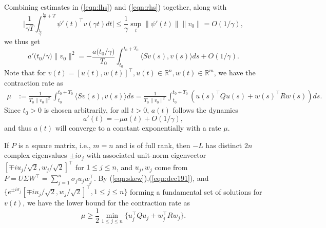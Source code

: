 \documentclass[11pt]{article}
\newcommand{\Rm}{{\mathbb R}}
\newcommand{\1}{\mathds{1}}
\begin{document}
Combining estimates in (\ref{eqn:lhs}) and (\ref{eqn:rhs}) together, along with
\begin{equation*}
    \Big|\frac{1}{\gamma T}\int_{\frac{t_0}{\gamma}}^{\frac{t_0}{\gamma}+T} \psi'(t)^{\top} v(\gamma t) dt\Big| \leq \frac{1}{\gamma} \sup_t\|\psi'(t)\|\|v_0\| = O(1/\gamma),
\end{equation*}
we thus get
\begin{equation}
a'\big(t_0/\gamma\big)\|v_0\|^2 = -\frac{a\big(t_0/\gamma\big)}{T_0} \int_{t_0}^{t_0+T_0} \langle S v(s), v(s)\rangle ds + O(1/\gamma).
\end{equation}
Note that for $v(t) = [u(t), w(t)]^\top, u(t)\in \Rm^n, w(t)\in \Rm^m$, we have the contraction rate as
\begin{equation}\label{eqn:dec191}
\begin{aligned}
    \mu &:= \frac{1}{T_0\|v_0\|^2} \int_{t_0}^{t_0+T_0} \langle S v(s), v(s)\rangle ds=\frac{1}{T_0\|v_0\|^2} \int_{t_0}^{t_0+T_0} (u(s)^{\top} Qu(s)+ w(s)^{\top} R w(s)) ds.
    \end{aligned}
\end{equation}
Since $t_0>0$ is chosen arbitrarily, for all $t>0$, $a(t)$ follows the dynamics 
\begin{equation}
    a'(t) = -\mu a(t) + O(1/\gamma),
\end{equation}
and thus $a(t)$ will converge to a constant exponentially with a rate $\mu$. 

If $P$ is a square matrix, i.e., $m=n$ and is of full rank, then $-L$ has distinct $2n$ complex eigenvalues $\pm i \sigma_j $ with associated unit-norm eigenvector $[\mp i u_j/\sqrt{2}, w_j/\sqrt{2}]^\top$ for $1\leq j\leq n$, and  $u_j, w_j$ come from $P = U\Sigma W^\top = \sum_{j=1}^n \sigma_j u_j w_j^\top$. By (\ref{eqn:skew}),(\ref{eqn:dec191}), and $\{e^{\pm i \sigma_j}[\mp i u_j/\sqrt{2}, w_j/\sqrt{2}]^\top, 1\leq j\leq n\}$ forming a fundamental set of solutions for $v(t)$, we have the lower bound for the contraction rate as
\begin{equation}
    \mu \geq \frac{1}{2} \min_{1\leq j\leq n}\{ u_j^\top Q u_j+  w_j^\top R w_j \}.
\end{equation}
\end{document}
